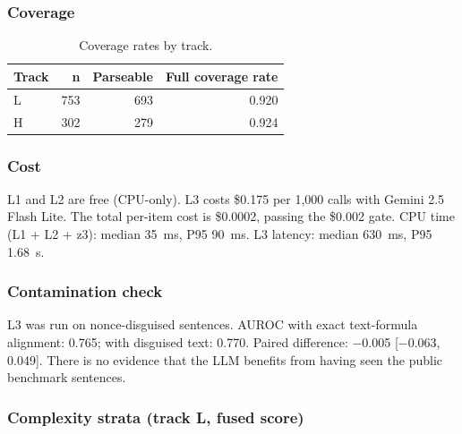 \documentclass[11pt,letterpaper]{article}
\begin{document}
\subsubsection{Coverage}

\begin{table}[!htbp]
\centering
\caption{Coverage rates by track.}
\label{tab:coverage}
\begin{tabular}{lrrr}
\toprule
Track & n & Parseable & Full coverage rate \\
\midrule
L & 753 & 693 & 0.920 \\
H & 302 & 279 & 0.924 \\
\bottomrule
\end{tabular}
\end{table}

\subsubsection{Cost}

L1 and L2 are free (CPU-only). L3 costs \$0.175 per 1,000 calls with Gemini 2.5 Flash Lite. The total per-item cost is \$0.0002, passing the \$0.002 gate. CPU time (L1 + L2 + z3): median 35~ms, P95 90~ms. L3 latency: median 630~ms, P95 1.68~s.

\subsubsection{Contamination check}

L3 was run on nonce-disguised sentences. AUROC with exact text-formula alignment: 0.765; with disguised text: 0.770. Paired difference: $-$0.005 [$-$0.063, 0.049]. There is no evidence that the LLM benefits from having seen the public benchmark sentences.

\subsubsection{Complexity strata (track L, fused score)}
\end{document}
